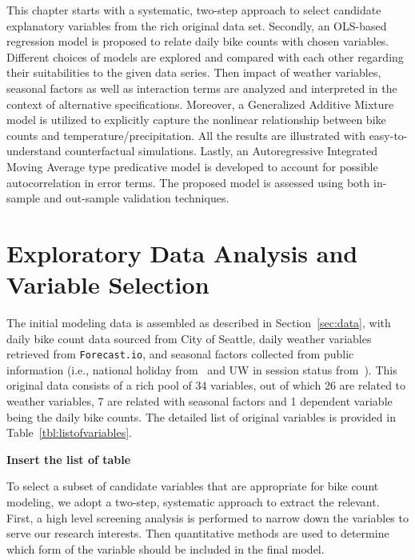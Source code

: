 \documentclass [11pt, proquest] {uwthesis}[2015/03/03]
\begin{document}
This chapter starts with a systematic, two-step approach to select candidate explanatory variables from the rich original data set.  Secondly, an OLS-based regression model is proposed to relate daily bike counts with chosen variables. Different choices of models are explored and compared with each other regarding their suitabilities to the given data series. Then impact of weather variables, seasonal factors as well as interaction terms are analyzed and interpreted in the context of alternative specifications. Moreover, a Generalized  Additive Mixture model is utilized to explicitly capture the nonlinear relationship between bike counts and temperature/precipitation. All the results are illustrated with easy-to-understand counterfactual simulations. Lastly, an Autoregressive Integrated Moving Average type predicative model is developed to account for possible autocorrelation in error terms. The proposed model is assessed using both in-sample and out-sample validation techniques.


\section{Exploratory Data Analysis and Variable Selection}

The initial modeling data is assembled as described in Section~\ref{sec:data}, with daily bike count data sourced from City of Seattle, daily weather variables retrieved from \texttt{Forecast.io}, and seasonal factors collected from public information (i.e., national holiday from~\cite{} and UW in session status from~\cite{}). This original data consists of a rich pool of 34 variables, out of which 26 are related to weather variables, 7 are related with seasonal factors and 1 dependent variable being the daily bike counts. The detailed list of original variables is provided in Table~\ref{tbl:listofvariables}.

\textbf{Insert the list of table}

To select a subset of candidate variables that are appropriate for bike count modeling, we adopt a two-step, systematic approach to extract the relevant. First, a high level screening analysis is performed to narrow down the variables to serve our research interests. Then quantitative methods are used to determine which form of the variable should be included in the final model. 
\end{document}
